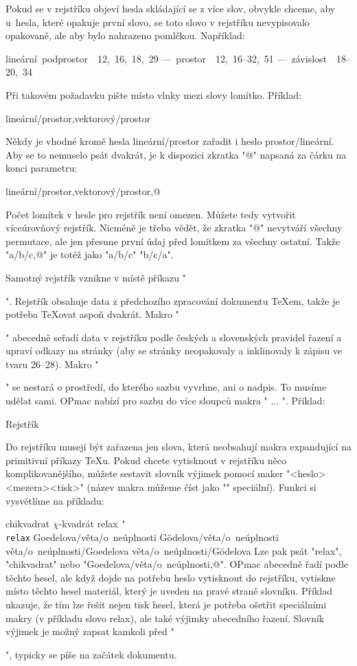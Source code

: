 Pokud se v rejstříku objeví hesla skládající se z více slov, obvykle chceme,
aby u~hesla, které opakuje první slovo, se toto slovo 
v rejstříku nevypisovalo opakovaně, ale
aby bylo nahrazeno pomlčkou. Například:
\par\nobreak
\medskip
\hbox{\indent lineární podprostor \ 12, 16, 18, 29}\nobreak
\hbox{\indent \space --- prostor \ 12, 16--32, 51}\nobreak
\hbox{\indent \space --- závislost \ 18--20, 34}
\medskip

\noindent Při takovém požadavku pište místo vlnky mezi slovy lomítko. Příklad:

\begtt
\ii lineární/prostor,vektorový/prostor
\endtt

Někdy je vhodné kromě hesla lineární/prostor zařadit i heslo
prostor/lineární. Aby se to nemuselo psát dvakrát, je k dispozici zkratka
"@" napsaná za čárku na konci parametru:

\begtt
\ii lineární/prostor,vektorový/prostor,@
\endtt

Počet lomítek v hesle pro rejstřík není omezen. Můžete tedy vytvořit
víceúrovňový rejstřík. Nicméně je třeba vědět, že zkratka "@" nevytváří
všechny permutace, ale jen přesune první údaj před lomítkem za všechny
ostatní. Takže "\ii a/b/c,@" je totéž jako "\ii a/b/c" "\ii b/c/a".

Samotný rejstřík vznikne v místě příkazu "\makeindex". Rejstřík obsahuje
data z předchozího zpracování dokumentu \TeX{}em, takže je potřeba
\TeX{}ovat aspoň dvakrát. Makro "\makeindex" abecedně seřadí data v rejstříku
podle českých a slovenských pravidel řazení a upraví odkazy na stránky
(aby se stránky neopakovaly a inklinovaly k zápisu ve tvaru 26--28). Makro
"\makeindex" se nestará o prostředí, do kterého sazbu vyvrhne, ani o nadpis.
To musíme udělat sami. OPmac nabízí pro sazbu do více sloupců makra
" ... \endmulti". Příklad:

\begtt
\sec Rejstřík\par
{} \makeindex \endmulti
\endtt

Do rejstříku musejí být zařazena jen  slova, která neobsahují makra
expandující na primitivní příkazy \TeX{}u. Pokud chcete vytisknout v rejstříku
něco komplikovanějšího, můžete sestavit slovník výjimek pomocí 
maker "\iis <heslo><mezera>{<tisk>}" 
(název makra můžeme číst jako "\ii" speciální). 
Funkci si vysvětlíme na příkladu:

\begtt
\iis chikvadrat {$\chi$-kvadrát}
\iis relax {{\tt \char`\\relax}}
\iis Goedelova/věta/o~neúplnosti {G\"odelova/věta/o~neúplnosti}
\iis věta/o~neúplnosti/Goedelova {věta/o~neúplnosti/G\"odelova}
\endtt
%
Lze pak psát "\ii relax", "\ii chikvadrat" nebo 
"\ii Goedelova/věta/o~neúplnosti,@". 
OPmac abecedně řadí podle těchto hesel, ale když dojde
na potřebu heslo vytisknout do rejstříku, vytiskne místo těchto hesel
materiál, 
který je uveden na pravé straně slovníku. 
Příklad ukazuje, že tím lze
řešit nejen tisk hesel, která je potřeba ošetřit
speciálními makry (v příkladu slovo relax), ale také
výjimky abecedního řazení.
%
Slovník výjimek je možný zapsat kamkoli před "\makeindex", 
typicky se píše na začátek dokumentu. 

